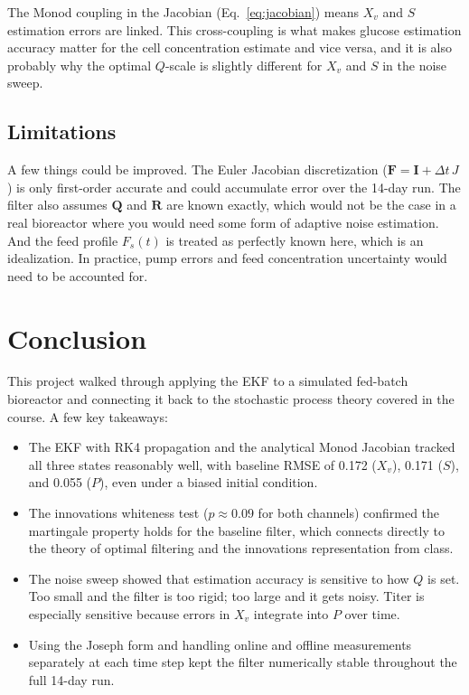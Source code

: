 \documentclass[11pt,letterpaper]{article}
\newcommand{\xv}{X_{v}}
\newcommand{\Fs}{F_{s}}
\newcommand{\bF}{\mathbf{F}}
\newcommand{\bQ}{\mathbf{Q}}
\newcommand{\bR}{\mathbf{R}}
\newcommand{\bI}{\mathbf{I}}
\begin{document}
The Monod coupling in the Jacobian (Eq.~\ref{eq:jacobian}) means $\xv$ and $S$ estimation
errors are linked. This cross-coupling is what makes glucose estimation accuracy matter for
the cell concentration estimate and vice versa, and it is also probably why the optimal
$Q$-scale is slightly different for $\xv$ and $S$ in the noise sweep.

\subsection{Limitations}

A few things could be improved. The Euler Jacobian discretization ($\bF = \bI + \Delta t\,J$)
is only first-order accurate and could accumulate error over the 14-day run. The filter also
assumes $\bQ$ and $\bR$ are known exactly, which would not be the case in a real bioreactor
where you would need some form of adaptive noise estimation. And the feed profile $\Fs(t)$ is
treated as perfectly known here, which is an idealization. In practice, pump errors and feed
concentration uncertainty would need to be accounted for.

\section{Conclusion}
\label{sec:conclusion}

This project walked through applying the EKF to a simulated fed-batch bioreactor and connecting
it back to the stochastic process theory covered in the course. A few key takeaways:

\begin{itemize}
    \item The EKF with RK4 propagation and the analytical Monod Jacobian tracked all three
          states reasonably well, with baseline RMSE of 0.172 ($\xv$), 0.171 ($S$), and
          0.055 ($P$), even under a biased initial condition.

    \item The innovations whiteness test ($p \approx 0.09$ for both channels) confirmed the
          martingale property holds for the baseline filter, which connects directly to the
          theory of optimal filtering and the innovations representation from class.

    \item The noise sweep showed that estimation accuracy is sensitive to how $Q$ is set.
          Too small and the filter is too rigid; too large and it gets noisy. Titer is
          especially sensitive because errors in $\xv$ integrate into $P$ over time.

    \item Using the Joseph form and handling online and offline measurements separately at
          each time step kept the filter numerically stable throughout the full 14-day run.
\end{itemize}
\end{document}

